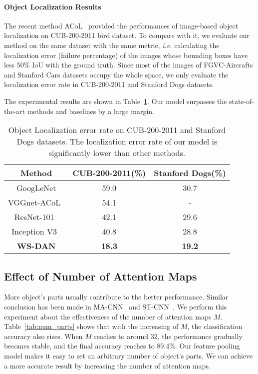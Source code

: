 \documentclass[10pt,twocolumn,letterpaper]{article}
\def\ie{{\em i.e. }}
\begin{document}
\paragraph{Object Localization Results}
 The recent method ACoL~\cite{acol} provided the performances of image-based object localization on CUB-200-2011 bird dataset. To compare with it, we evaluate our method on the same dataset with the same metric, \ie calculating the localization error (failure percentage) of the images whose bounding boxes have less 50\% IoU with the ground truth. Since most of the images of FGVC-Aircrafts and Stanford Cars datasets occupy the whole space, we only evaluate the localization error rate in CUB-200-2011 and Stanford Dogs datasets.

 The experimental results are shown in Table~\ref{tab:localiztion_error}. Our model surpasses the state-of-the-art methods and baselines by a large margin.



\begin{table}[h]
	\begin{center}
		\scriptsize
		\begin{tabular}{c|c|c}
			\hline
			Method & CUB-200-2011(\%) & Stanford Dogs(\%)\\
			\hline
			GoogLeNet  &  59.0 & 30.7 \\
      VGGnet-ACoL~\cite{acol} &  54.1 & - \\
      ResNet-101~\cite{resnet} & 42.1 & 29.6 \\
      Inception V3~\cite{densenet} & 40.8 & 28.8 \\
      \hline
			\textbf{WS-DAN} & \textbf{18.3} & \textbf{19.2}\\
			\hline
		\end{tabular}
	\end{center}
	\caption {Object Localization error rate on CUB-200-2011 and Stanford Dogs datasets. The localization error rate of our model is significantly lower than other methods.}
	\label{tab:localiztion_error}
\end{table}

\subsection{Effect of Number of Attention Maps}
More object's parts usually contribute to the better performance. Similar conclusion has been made in MA-CNN~\cite{ma-cnn} and ST-CNN~\cite{stn}. We perform this experiment about the effectiveness of the number of attention maps $M$. Table~\ref{tab:num_parts} shows that with the increasing of $M$, the classification accuracy also rises. When $M$ reaches to around 32, the performance gradually becomes stable, and the final accuracy reaches to 89.4\%. Our feature pooling model makes it easy to set an arbitrary number of object's parts. We can achieve a more accurate result by increasing the number of attention maps.
\end{document}
